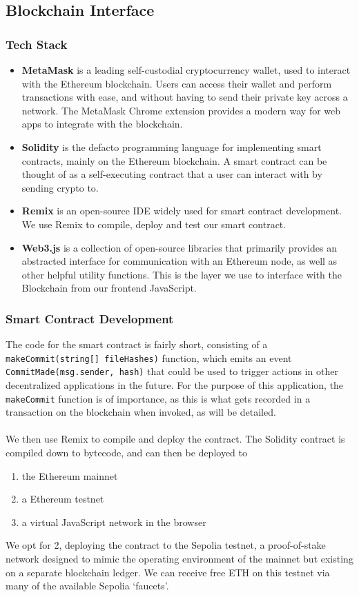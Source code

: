 \documentclass[12pt,a4paper]{article}
\begin{document}
\subsection{Blockchain Interface}
\subsubsection{Tech Stack}
\begin{itemize}
    \item \textbf{MetaMask} is a leading self-custodial cryptocurrency wallet, used to interact with the Ethereum blockchain. Users can access their wallet and perform transactions with ease, and without having to send their private key across a network. The MetaMask Chrome extension provides a modern way for web apps to integrate with the blockchain.
    \item \textbf{Solidity} is the defacto programming language for implementing smart contracts, mainly on the Ethereum blockchain. A smart contract can be thought of as a self-executing contract that a user can interact with by sending crypto to.
    \item \textbf{Remix} is an open-source IDE widely used for smart contract development. We use Remix to compile, deploy and test our smart contract. 
    \item \textbf{Web3.js} is a collection of open-source libraries that primarily provides an abstracted interface for communication with an Ethereum node, as well as other helpful utility functions. This is the layer we use to interface with the Blockchain from our frontend JavaScript.
\end{itemize}
\subsubsection{Smart Contract Development}
The code for the smart contract is fairly short, consisting of a 
\\\verb|makeCommit(string[] fileHashes)| function, which emits an event\\ \verb|CommitMade(msg.sender, hash)| that could be used to trigger actions in other decentralized applications in the future. For the purpose of this application, the \verb|makeCommit| function is of importance, as this is what gets recorded in a transaction on the blockchain when invoked, as will be detailed.\\\\
We then use Remix to compile and deploy the contract. The Solidity contract is compiled down to bytecode, and can then be deployed to
\begin{enumerate}
    \item the Ethereum mainnet
    \item a Ethereum testnet
    \item a virtual JavaScript network in the browser
\end{enumerate}
We opt for 2,  deploying the contract to the Sepolia testnet, a proof-of-stake network designed to mimic the operating environment of the mainnet but existing on a separate blockchain ledger. We can receive free ETH on this testnet via many of the available Sepolia `faucets'.
\end{document}
